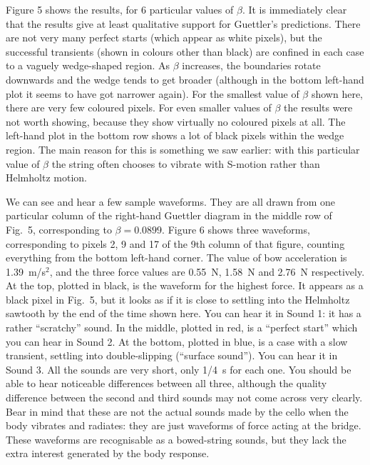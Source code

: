   Figure 5 shows the results, for 6 particular values of $\beta$. It is 
  immediately clear that the results give at least qualitative support for 
  Guettler's predictions. There are not very many perfect starts (which appear 
  as white pixels), but the successful transients (shown in colours other than 
  black) are confined in each case to a vaguely wedge-shaped region. As $\beta$ 
  increases, the boundaries rotate downwards and the wedge tends to get broader 
  (although in the bottom left-hand plot it seems to have got narrower again). 
  For the smallest value of $\beta$ shown here, there are very few coloured 
  pixels. For even smaller values of $\beta$ the results were not worth 
  showing, because they show virtually no coloured pixels at all. The left-hand 
  plot in the bottom row shows a lot of black pixels within the wedge region. 
  The main reason for this is something we saw earlier: with this particular 
  value of $\beta$ the string often chooses to vibrate with S-motion rather 
  than Helmholtz motion. 

  We can see and hear a few sample waveforms. They are all drawn from one 
  particular column of the right-hand Guettler diagram in the middle row of 
  Fig.\ 5, corresponding to $\beta=0.0899$. Figure 6 shows three waveforms, 
  corresponding to pixels 2, 9 and 17 of the 9th column of that figure, 
  counting everything from the bottom left-hand corner. The value of bow 
  acceleration is 1.39~m/s$^2$, and the three force values are 0.55~N, 1.58~N 
  and 2.76~N respectively. At the top, plotted in black, is the waveform for 
  the highest force. It appears as a black pixel in Fig.\ 5, but it looks as if 
  it is close to settling into the Helmholtz sawtooth by the end of the time 
  shown here. You can hear it in Sound 1: it has a rather ``scratchy'' sound. 
  In the middle, plotted in red, is a ``perfect start'' which you can hear in 
  Sound 2. At the bottom, plotted in blue, is a case with a slow transient, 
  settling into double-slipping (``surface sound''). You can hear it in Sound 
  3. All the sounds are very short, only 1/4~s for each one. You should be able 
  to hear noticeable differences between all three, although the quality 
  difference between the second and third sounds may not come across very 
  clearly. Bear in mind that these are not the actual sounds made by the cello 
  when the body vibrates and radiates: they are just waveforms of force acting 
  at the bridge. These waveforms are recognisable as a bowed-string sounds, but 
  they lack the extra interest generated by the body response. 


